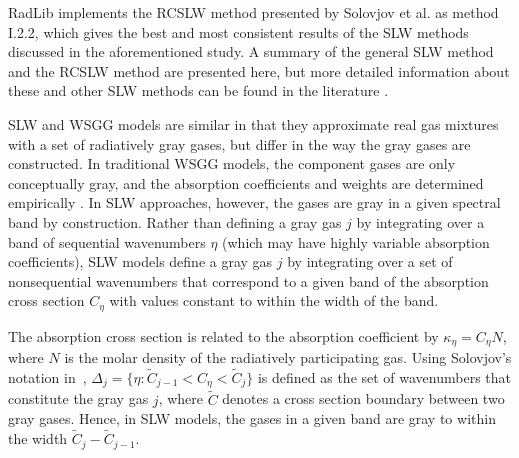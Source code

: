 \documentclass[preprint,12pt]{elsarticle}
\begin{document}
RadLib implements the RCSLW method presented by Solovjov et al. \cite{Solovjov_2017} as method I.2.2, which gives the best and most consistent results of the SLW methods discussed in the aforementioned study. A summary of the general SLW method and the RCSLW method are presented here, but more detailed information about these and other SLW methods can be found in the literature \cite{Solovjov_2000, Solovjov_2001, Solovjov_2008, Solovjov_2011, Solovjov_2014, Solovjov_2016, Solovjov_2017, Webb_2018}.

SLW and WSGG models are similar in that they approximate real gas mixtures with a set of radiatively gray gases, but differ in the way the gray gases are constructed. In traditional WSGG models, the component gases are only conceptually gray, and the absorption coefficients and weights are determined empirically \citep{Badger_2019}. In SLW approaches, however, the gases are gray in a given spectral band by construction. Rather than defining a gray gas $j$ by integrating over a band of sequential wavenumbers $\eta$ (which may have highly variable absorption coefficients), SLW models define a gray gas $j$ by integrating over a set of nonsequential wavenumbers that correspond to a given band of the absorption cross section $C_{\eta}$ with values constant to within the width of the band.

The absorption cross section is related to the absorption coefficient by $\kappa_\eta=C_\eta N$, where $N$ is the molar density of the radiatively participating gas.
%
Using Solovjov's notation in~\cite{Solovjov_2017}, $\Delta_j=\{\eta:\tilde{C}_{j-1}<C_\eta<\tilde{C}_j\}$ is defined as the set of wavenumbers that constitute the gray gas $j$, where $\tilde{C}$ denotes a cross section boundary between two gray gases. Hence, in SLW models, the gases in a given band are gray to within the width $\tilde{C}_j-\tilde{C}_{j-1}$.
\end{document}
